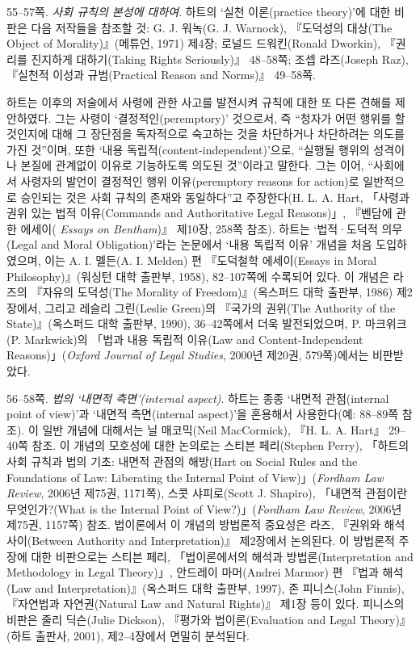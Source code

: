 {55--57쪽. \emph{사회 규칙의 본성에 대하여}. 하트의 `실천 이론(practice
theory)'에 대한 비판은 다음 저작들을 참조할 것: G. J. 워녹(G. J.
Warnock), 『도덕성의 대상(The Object of Morality)』(메튜언, 1971) 제4장;
로널드 드워킨(Ronald Dworkin), 『권리를 진지하게 대하기(Taking Rights
Seriously)』 48--58쪽; 조셉 라즈(Joseph Raz), 『실천적 이성과
규범(Practical Reason and Norms)』 49--58쪽.

하트는 이후의 저술에서 사령에 관한 사고를 발전시켜 규칙에 대한 또 다른
견해를 제안하였다. 그는 사령이 `결정적인(peremptory)' 것으로서, 즉
``청자가 어떤 행위를 할 것인지에 대해 그 장단점을 독자적으로 숙고하는
것을 차단하거나 차단하려는 의도를 가진 것''이며, 또한 `내용
독립적(content-independent)'으로, ``실행될 행위의 성격이나 본질에
관계없이 이유로 기능하도록 의도된 것''이라고 말한다. 그는 이어,
``사회에서 사령자의 발언이 결정적인 행위 이유(peremptory reasons for
action)로 일반적으로 승인되는 것은 사회 규칙의 존재와 동일하다''고
주장한다(H. L. A. Hart, 「사령과 권위 있는 법적 이유(Commands and
Authoritative Legal Reasons)」, 『벤담에 관한 에세이( \emph{Essays on
Bentham})』 제10장, 258쪽 참조). 하트는 `법적·도덕적 의무(Legal and
Moral Obligation)'라는 논문에서 `내용 독립적 이유' 개념을 처음
도입하였으며, 이는 A. I. 멜든(A. I. Melden) 편 『도덕철학 에세이(Essays
in Moral Philosophy)』(워싱턴 대학 출판부, 1958), 82--107쪽에 수록되어
있다. 이 개념은 라즈의 『자유의 도덕성(The Morality of
Freedom)』(옥스퍼드 대학 출판부, 1986) 제2장에서, 그리고 레슬리
그린(Leslie Green)의 『국가의 권위(The Authority of the
State)』(옥스퍼드 대학 출판부, 1990), 36--42쪽에서 더욱 발전되었으며, P.
마크위크(P. Markwick)의 「법과 내용 독립적 이유(Law and
Content-Independent Reasons)」(\emph{Oxford Journal of Legal Studies},
2000년 제20권, 579쪽)에서는 비판받았다.

56--58쪽. \emph{법의 `내면적 측면'(internal aspect)}. 하트는 종종
`내면적 관점(internal point of view)'과 `내면적 측면(internal aspect)'을
혼용해서 사용한다(예: 88--89쪽 참조). 이 일반 개념에 대해서는 닐
매코믹(Neil MacCormick), 『H. L. A. Hart』 29--40쪽 참조. 이 개념의
모호성에 대한 논의로는 스티븐 페리(Stephen Perry), 「하트의 사회 규칙과
법의 기초: 내면적 관점의 해방(Hart on Social Rules and the Foundations
of Law: Liberating the Internal Point of View)」(\emph{Fordham Law
Review}, 2006년 제75권, 1171쪽), 스콧 샤피로(Scott J. Shapiro), 「내면적
관점이란 무엇인가?(What is the Internal Point of View?)」(\emph{Fordham
Law Review}, 2006년 제75권, 1157쪽) 참조. 법이론에서 이 개념의 방법론적
중요성은 라즈, 『권위와 해석 사이(Between Authority and
Interpretation)』 제2장에서 논의된다. 이 방법론적 주장에 대한 비판으로는
스티븐 페리, 「법이론에서의 해석과 방법론(Interpretation and Methodology
in Legal Theory)」, 안드레이 마머(Andrei Marmor) 편 『법과 해석(Law and
Interpretation)』(옥스퍼드 대학 출판부, 1997), 존 피니스(John Finnis),
『자연법과 자연권(Natural Law and Natural Rights)』 제1장 등이 있다.
피니스의 비판은 줄리 딕슨(Julie Dickson), 『평가와 법이론(Evaluation and
Legal Theory)』(하트 출판사, 2001), 제2--4장에서 면밀히 분석된다.

}

